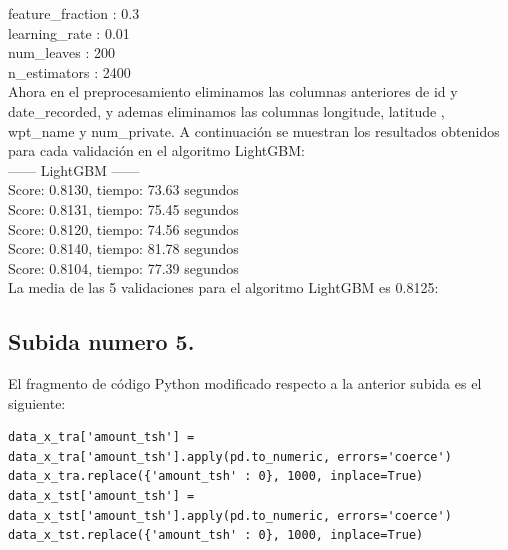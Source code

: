 	feature\_fraction : 0.3 \\
	learning\_rate : 0.01 \\
	num\_leaves : 200 \\
	n\_estimators : 2400 \\
	
	Ahora en el preprocesamiento eliminamos las columnas anteriores de id y date\_recorded, y ademas eliminamos
	las columnas longitude, latitude , wpt\_name y num\_private. A continuación se muestran los resultados 
	obtenidos para cada validación en el algoritmo LightGBM: \\

	------ LightGBM ------\\
	Score: 0.8130, tiempo:  73.63 segundos\\
	Score: 0.8131, tiempo:  75.45 segundos\\
	Score: 0.8120, tiempo:  74.56 segundos\\
	Score: 0.8140, tiempo:  81.78 segundos\\
	Score: 0.8104, tiempo:  77.39 segundos\\
	
	La media de las 5 validaciones para el algoritmo LightGBM es 0.8125:  \\

	
	\subsection[Subida numero 5]{Subida numero 5.}
	
	El fragmento de código Python modificado respecto a la anterior subida es el siguiente:
	
	\lstset{language=python}
	\begin{lstlisting}[frame=single]
data_x_tra['amount_tsh'] = data_x_tra['amount_tsh'].apply(pd.to_numeric, errors='coerce')
data_x_tra.replace({'amount_tsh' : 0}, 1000, inplace=True)
data_x_tst['amount_tsh'] = data_x_tst['amount_tsh'].apply(pd.to_numeric, errors='coerce')
data_x_tst.replace({'amount_tsh' : 0}, 1000, inplace=True)
	\end{lstlisting}
	
	
